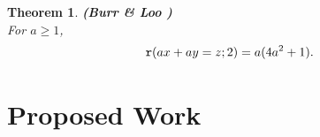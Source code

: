 \documentclass[12pt]{report}
\newtheorem{thm}{Theorem}[chapter]
\begin{document}
\begin{thm} {\bf (Burr \& Loo {\cite{BL}})} \\[5pt]
For $a\geq 1$, 
\[ {\tt {r}} (ax+ay=z;2) = a(4a^2+1). \]
\end{thm}



\chapter{Proposed Work}
\end{document}
